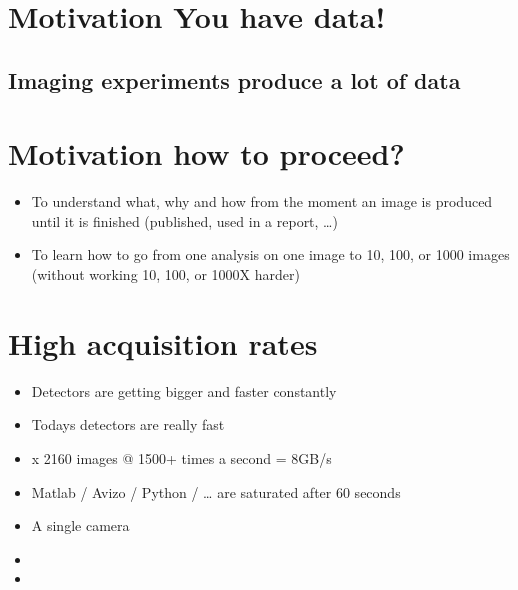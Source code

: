 \documentclass[letterpaper,10pt,english]{sphinxmanual}
\begin{document}
\section{Motivation \sphinxhyphen{} You have data!}
\label{\detokenize{01-Introduction:motivation-you-have-data}}

\subsection{Imaging experiments produce a lot of data}
\label{\detokenize{01-Introduction:imaging-experiments-produce-a-lot-of-data}}
\sphinxAtStartPar
{}


\section{Motivation \sphinxhyphen{} how to proceed?}
\label{\detokenize{01-Introduction:motivation-how-to-proceed}}
\sphinxAtStartPar
{}
\begin{itemize}
\item {} 
\sphinxAtStartPar
To understand what, why and how from the moment an image is produced until it is finished (published, used in a report, …)

\item {} 
\sphinxAtStartPar
To learn how to go from one analysis on one image to 10, 100, or 1000 images (without working 10, 100, or 1000X harder)

\end{itemize}


\section{High acquisition rates}
\label{\detokenize{01-Introduction:high-acquisition-rates}}\begin{itemize}
\item {} 
\sphinxAtStartPar
Detectors are getting bigger and faster constantly

\item {} 
\sphinxAtStartPar
Todays detectors are really fast

\item {} 
 x 2160 images @ 1500+ times a second = 8GB/s

\item {} 
\sphinxAtStartPar
Matlab / Avizo / Python / … are saturated after 60 seconds

\item {} 
\sphinxAtStartPar
A single camera

\item {} 
\sphinxAtStartPar
{}

\item {} 
\sphinxAtStartPar
{}

\end{itemize}
\end{document}
